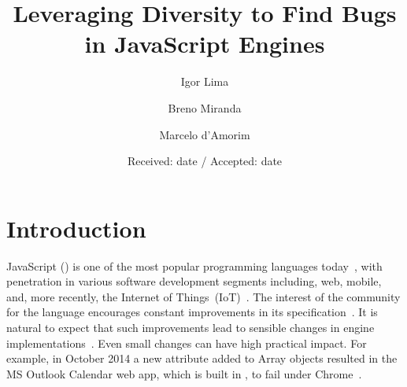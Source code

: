 \documentclass[smallextended]{svjour3}
\begin{document}
\title{Leveraging Diversity to Find Bugs in JavaScript Engines}

\author{Igor Lima \and Breno Miranda\footnotemark \and Marcelo d'Amorim}


\date{Received: date / Accepted: date}




\maketitle


\begin{abstract}
  
\end{abstract}



\section{Introduction}

JavaScript (\js{}) is one of the most popular programming languages
today~\cite{stackify,redmonk-javascript}, with penetration in various software development segments including, web, mobile,
and, more recently, the Internet of
Things~(IoT)~\cite{simply-technologies}. The interest of the community
for the language encourages constant improvements in its specification~\cite{ecmas262-spec}. It is natural to expect that such improvements
lead to sensible changes in engine implementations~\cite{kangax}. Even small
changes can have high practical impact. For example, in October 2014 a
new attribute added to Array objects resulted in the MS Outlook
Calendar web app, which is built in \js{}, to fail under
Chrome~\cite{array-bug-chromium-issue4247,array-bug-discussion}.
\end{document}

